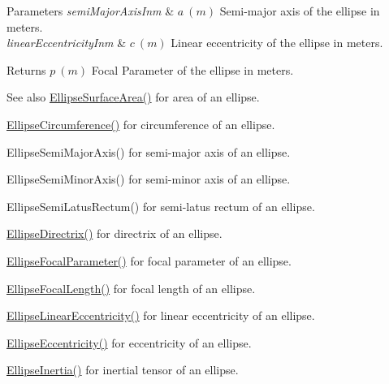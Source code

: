 \begin{DoxyParams}{Parameters}
{\em semi\+Major\+Axis\+Inm} & $ a\ (m)$ Semi-\/major axis of the ellipse in meters. \\
\hline
{\em linear\+Eccentricity\+Inm} & $ c\ (m)$ Linear eccentricity of the ellipse in meters. \\
\hline
\end{DoxyParams}
\begin{DoxyReturn}{Returns}
$ p\ (m)$ Focal Parameter of the ellipse in meters. 
\end{DoxyReturn}
\begin{DoxySeeAlso}{See also}
\mbox{\hyperlink{group___e_g_x_math-_geometry-2_d-_ellipse-_surface_area_ga4ce8c8323e9718ce5458f4ab7f6d823d}{Ellipse\+Surface\+Area()}} for area of an ellipse. 

\mbox{\hyperlink{group___e_g_x_math-_geometry-2_d-_ellipse-_circumference_ga4172802ac674eb53467b44928ac635c7}{Ellipse\+Circumference()}} for circumference of an ellipse. 

Ellipse\+Semi\+Major\+Axis() for semi-\/major axis of an ellipse. 

Ellipse\+Semi\+Minor\+Axis() for semi-\/minor axis of an ellipse. 

Ellipse\+Semi\+Latus\+Rectum() for semi-\/latus rectum of an ellipse. 

\mbox{\hyperlink{group___e_g_x_math-_geometry-2_d-_ellipse-_directrix_gace8f72a8efbc9c18d3eb689151405106}{Ellipse\+Directrix()}} for directrix of an ellipse. 

\mbox{\hyperlink{group___e_g_x_math-_geometry-2_d-_ellipse-_focal_parameter_ga4cd01a38c72c092ef9791351948bf69b}{Ellipse\+Focal\+Parameter()}} for focal parameter of an ellipse. 

\mbox{\hyperlink{group___e_g_x_math-_geometry-2_d-_ellipse-_focal_length_gab8d63de7640c880cfecaeada6f2afdac}{Ellipse\+Focal\+Length()}} for focal length of an ellipse. 

\mbox{\hyperlink{group___e_g_x_math-_geometry-2_d-_ellipse-_linear_eccentricity_gac70b3010e30aa8b73deb50fe2b9b9a91}{Ellipse\+Linear\+Eccentricity()}} for linear eccentricity of an ellipse. 

\mbox{\hyperlink{group___e_g_x_math-_geometry-2_d-_ellipse-_eccentricity_ga6a0a7fba17f782616894cfc447628c33}{Ellipse\+Eccentricity()}} for eccentricity of an ellipse. 

\mbox{\hyperlink{group___e_g_x_math-_geometry-2_d-_ellipse-_inertia_ga10a3049c2f04b50f271fb01dc62e4cf8}{Ellipse\+Inertia()}} for inertial tensor of an ellipse. 
\end{DoxySeeAlso}
\mbox{\label{group___e_g_x_math-_geometry-2_d-_ellipse-_focal_parameter_gaf957cf9131d3998bfe944f6234a133e6}} 
